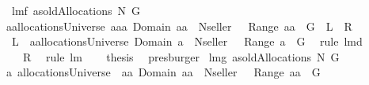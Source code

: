 \begin{isabellebody}
\endisatagproof
{\isafoldproof}%
%
\isadelimproof
\isanewline
%
\endisadelimproof
\isanewline
{}\isamarkupfalse%
\ lm{}{}f{\isacharcolon}\ {\isachardoublequoteopen}{\isacharparenleft}a{\isasymin}soldAllocations{\isacharprime}{\isacharprime}\ N\ G{\isacharparenright}{\isacharequal}\isanewline
{\isacharparenleft}a{\isasymin}allocationsUniverse{\isacharampersand}\ a{\isasymin}{\isacharbraceleft}aa{\isachardot}\ Domain\ aa\ {\isasymsubseteq}\ N{\isacharminus}{\isacharbraceleft}seller{\isacharbraceright}\ {\isacharampersand}\ {\isasymUnion}\ Range\ aa\ {\isasymsubseteq}\ G{\isacharbraceright}{\isacharparenright}{\isachardoublequoteclose}\ {\isacharparenleft}\ {\isachardoublequoteopen}{\isacharquery}L\ {\isacharequal}\ {\isacharquery}R{\isachardoublequoteclose}{\isacharparenright}\ \isanewline
%
\isadelimproof
%
\endisadelimproof
%
\isatagproof
{}\isamarkupfalse%
\ {\isacharminus}\isanewline
\ \ \isamarkupfalse%
\ {\isachardoublequoteopen}{\isacharquery}L\ {\isacharequal}\ {\isacharparenleft}a{\isasymin}allocationsUniverse{\isacharampersand}\ Domain\ a\ {\isasymsubseteq}\ N{\isacharminus}{\isacharbraceleft}seller{\isacharbraceright}\ {\isacharampersand}\ {\isasymUnion}\ Range\ a\ {\isasymsubseteq}\ G{\isacharparenright}{\isachardoublequoteclose}\ \isamarkupfalse%
\ {\isacharparenleft}rule\ lm{}{}d{\isacharparenright}\isanewline
\ \ \isamarkupfalse%
\ \isamarkupfalse%
\ {\isachardoublequoteopen}{\isachardot}{\isachardot}{\isachardot}\ {\isacharequal}\ {\isacharquery}R{\isachardoublequoteclose}\ \isamarkupfalse%
\ {\isacharparenleft}rule\ lm{}{}{\isacharparenright}\ \isamarkupfalse%
\ \isamarkupfalse%
\ {\isacharquery}thesis\ \isamarkupfalse%
\ presburger\isanewline
{}\isamarkupfalse%
%
\endisatagproof
{\isafoldproof}%
%
\isadelimproof
\isanewline
%
\endisadelimproof
\isanewline
{}\isamarkupfalse%
\ lm{}{}g{\isacharcolon}\ {\isachardoublequoteopen}a{\isasymin}soldAllocations{\isacharprime}{\isacharprime}\ N\ G{\isacharequal}\isanewline
{\isacharparenleft}a{\isasymin}\ {\isacharparenleft}allocationsUniverse\ {\isasyminter}\ {\isacharbraceleft}aa{\isachardot}\ Domain\ aa\ {\isasymsubseteq}\ N{\isacharminus}{\isacharbraceleft}seller{\isacharbraceright}\ {\isacharampersand}\ {\isasymUnion}\ Range\ aa\ {\isasymsubseteq}\ G{\isacharbraceright}{\isacharparenright}{\isacharparenright}{\isachardoublequoteclose}\ \isanewline

\end{isabellebody}
